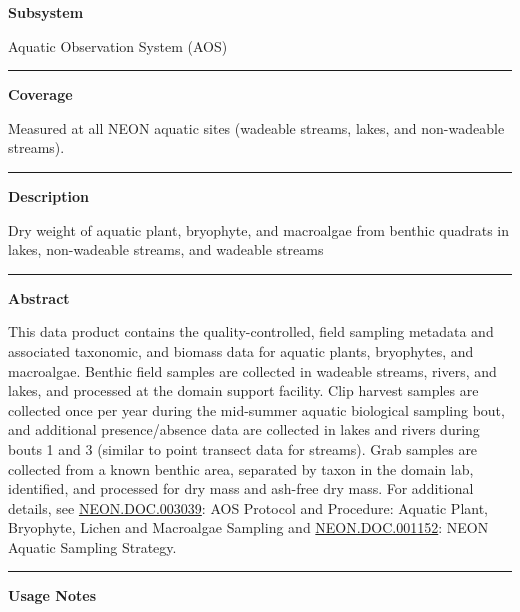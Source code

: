 \documentclass[]{article}
\begin{document}
\textbf{Subsystem}

Aquatic Observation System (AOS)

\begin{center}\rule{0.5\linewidth}{\linethickness}\end{center}

\textbf{Coverage}

Measured at all NEON aquatic sites (wadeable streams, lakes, and
non-wadeable streams).

\begin{center}\rule{0.5\linewidth}{\linethickness}\end{center}

\textbf{Description}

Dry weight of aquatic plant, bryophyte, and macroalgae from benthic
quadrats in lakes, non-wadeable streams, and wadeable streams

\begin{center}\rule{0.5\linewidth}{\linethickness}\end{center}

\textbf{Abstract}

This data product contains the quality-controlled, field sampling
metadata and associated taxonomic, and biomass data for aquatic plants,
bryophytes, and macroalgae. Benthic field samples are collected in
wadeable streams, rivers, and lakes, and processed at the domain support
facility. Clip harvest samples are collected once per year during the
mid-summer aquatic biological sampling bout, and additional
presence/absence data are collected in lakes and rivers during bouts 1
and 3 (similar to point transect data for streams). Grab samples are
collected from a known benthic area, separated by taxon in the domain
lab, identified, and processed for dry mass and ash-free dry mass. For
additional details, see
\href{http://data.neonscience.org/api/v0/documents/NEON.DOC.003039vB}{NEON.DOC.003039}:
AOS Protocol and Procedure: Aquatic Plant, Bryophyte, Lichen and
Macroalgae Sampling and
\href{http://data.neonscience.org/api/v0/documents/NEON.DOC.001152vA}{NEON.DOC.001152}:
NEON Aquatic Sampling Strategy.

\begin{center}\rule{0.5\linewidth}{\linethickness}\end{center}

\textbf{Usage Notes}
\end{document}
